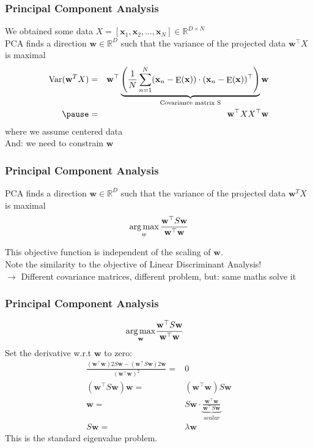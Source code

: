 \documentclass[Nike]{tuberlinbeamer}
\newcommand{\R}{\ensuremath{\mathds{R}}}
\newcommand{\bx}{{\mathbf x}}
\newcommand{\bw}{\mathbf{w}}
\DeclareMathOperator*{\E}{E}
\begin{document}
\begin{frame}\frametitle{Principal Component Analysis}
\small
We obtained some data $X=[\bx_1,\bx_2,\dots,\bx_N]\in\R^{D\times N}$\\
\vspace{1em}
PCA finds a direction $\bw \in\R^D$ such that the variance of the projected data $\bw^\top X$
is maximal
\begin{eqnarray*}
\Var(\bw^T X) &=&  \bw^\top \underbrace{\left( \frac{1}{N} \sum_{n = 1}^{N}  (\bx_n - \E(\bx)) \cdot  (\bx_n - \E(\bx))^\top \right)}_{\text{Covariance matrix S}}\bw \\ \pause
 &=&  \bw^\top X X^\top\bw
\end{eqnarray*}
\hfill where we assume centered data\\
\vspace{1em} \pause
And: we need to constrain $\bw$
\end{frame}

\begin{frame}\frametitle{Principal Component Analysis}
PCA finds a direction $\bw \in\R^D$ such that the variance of the projected data $\bw^T X$
is maximal
\begin{align} \nonumber
 \argmax_w \frac{\bw^{\top} S\bw}{\bw^\top \bw}
\end{align}

This objective function is independent of the scaling of $\bw$.  \\ \pause
\vspace{2em}
Note the similarity to the objective of Linear Discriminant Analysis! \\
\vspace{1em}
$\rightarrow$ Different covariance matrices, different problem, but: same maths solve it
\end{frame}

\begin{frame}\frametitle{Principal Component Analysis}
\begin{align}\nonumber
\argmax_{\bw} &\frac{\bw^{\top} S \bw}{\bw^\top\bw}
\end{align}
Set the derivative w.r.t $\bw$ to zero:\\
\begin{align}\nonumber
\frac{(\bw^{\top}\bw) 2 S \bw - (\bw^{\top}S \bw) 2 \bw}{(\bw^{\top}\bw)^2}= &0\\ \nonumber
(\bw^{\top}S\bw)\bw = & (\bw^{\top}\bw)S\bw\\ \nonumber
\bw = &S \bw \cdot \underbrace{\frac{\bw^{\top}\bw}{\bw^{\top}S\bw}}_{scalar} \\ \nonumber
S \bw = & \lambda \bw
\end{align}
This is the standard eigenvalue problem.
\end{frame}
\end{document}
